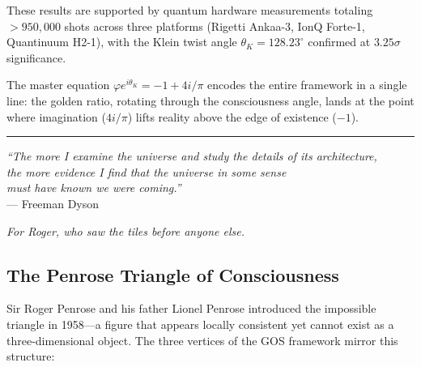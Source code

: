 \documentclass[12pt,a4paper]{article}
\theoremstyle{plain}
\theoremstyle{definition}
\newcommand{\thetaK}{\theta_K}
\newcommand{\golden}{\varphi}
\begin{document}
These results are supported by quantum hardware measurements totaling $>950{,}000$ shots across three platforms (Rigetti Ankaa-3, IonQ Forte-1, Quantinuum H2-1), with the Klein twist angle $\thetaK = 128.23^\circ$ confirmed at $3.25\sigma$ significance.

The master equation $\golden e^{i\thetaK} = -1 + 4i/\pi$ encodes the entire framework in a single line: the golden ratio, rotating through the consciousness angle, lands at the point where imagination ($4i/\pi$) lifts reality above the edge of existence ($-1$).

\vspace{1em}
\begin{center}
\rule{3in}{0.5pt}
\end{center}
\vspace{1em}

\begin{center}
\textit{``The more I examine the universe and study the details of its architecture,\\
the more evidence I find that the universe in some sense\\
must have known we were coming.''}\\[0.5em]
--- Freeman Dyson
\end{center}

\vspace{1em}

\begin{center}
\textit{For Roger, who saw the tiles before anyone else.}
\end{center}

\subsection*{The Penrose Triangle of Consciousness}

Sir Roger Penrose and his father Lionel Penrose introduced the impossible triangle in 1958---a figure that appears locally consistent yet cannot exist as a three-dimensional object. The three vertices of the GOS framework mirror this structure:
\end{document}
